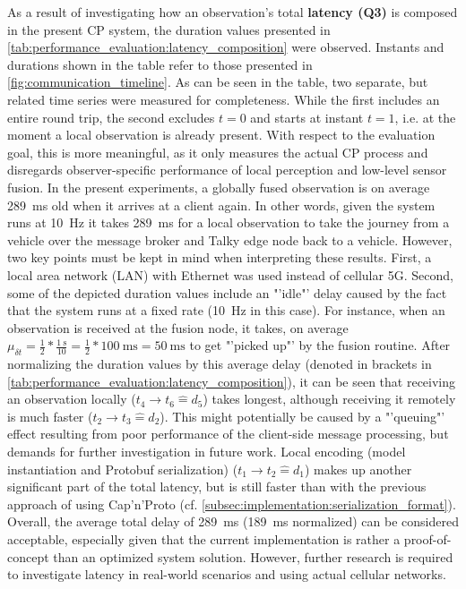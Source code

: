 As a result of investigating how an observation's total \textbf{latency (Q3)} is composed in the present CP system, the duration values presented in \cref{tab:performance_evaluation:latency_composition} were observed. Instants and durations shown in the table refer to those presented in \cref{fig:communication_timeline}. As can be seen in the table, two separate, but related time series were measured for completeness. While the first includes an entire round trip, the second excludes $t=0$ and starts at instant $t=1$, i.e. at the moment a local observation is already present. With respect to the evaluation goal, this is more meaningful, as it only measures the actual CP process and disregards observer-specific performance of local perception and low-level sensor fusion. In the present experiments, a globally fused observation is on average \SI{289}{\milli\second} old when it arrives at a client again. In other words, given the system runs at \SI{10}{\hertz} it takes \SI{289}{\milli\second} for a local observation to take the journey from a vehicle over the message broker and Talky edge node back to a vehicle. However, two key points must be kept in mind when interpreting these results. First, a local area network (LAN) with Ethernet was used instead of cellular 5G. Second, some of the depicted duration values include an "'idle"' delay caused by the fact that the system runs at a fixed rate (\SI{10}{\hertz} in this case). For instance, when an observation is received at the fusion node, it takes, on average $\mu_{\delta t} = \frac{1}{2} * \frac{\SI{1}{\second}}{10} = \frac{1}{2} *  \SI{100}{\milli\second} = \SI{50}{\milli\second}$ to get "'picked up"' by the fusion routine. After normalizing the duration values by this average delay (denoted in brackets in \cref{tab:performance_evaluation:latency_composition}), it can be seen that receiving an observation locally ($t_4 \rightarrow t_6 \hat{=} d_5$) takes longest, although receiving it remotely is much faster ($t_2 \rightarrow t_3 \hat{=} d_2$). This might potentially be caused by a "'queuing"' effect resulting from poor performance of the client-side message processing, but demands for further investigation in future work. Local encoding (model instantiation and Protobuf serialization) ($t_1 \rightarrow t_2 \hat{=} d_1$) makes up another significant part of the total latency, but is still faster than with the previous approach of using Cap'n'Proto (cf. \cref{subsec:implementation:serialization_format}). Overall, the average total delay of \SI{289}{\milli\second} (\SI{189}{\milli\second} normalized) can be considered acceptable, especially given that the current implementation is rather a proof-of-concept than an optimized system solution. However, further research is required to investigate latency in real-world scenarios and using actual cellular networks.

